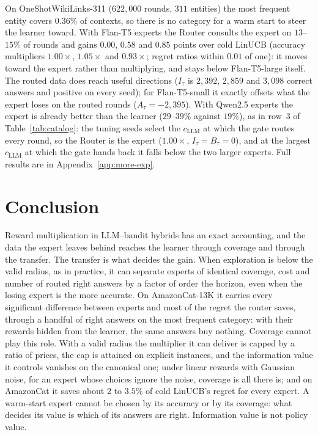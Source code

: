 \documentclass[anon]{alt2027} %
\begin{document}
On OneShotWikiLinks-311 ($622{,}000$ rounds, $311$ entities) the most
frequent entity covers $0.36\%$ of contexts, so there is no category for a
warm start to steer the learner toward. With Flan-T5 experts the Router
consults the expert on $13$--$15\%$ of rounds and gains $0.00$, $0.58$ and
$0.85$ points over cold LinUCB (accuracy multipliers $1.00\times$,
$1.05\times$ and $0.93\times$; regret ratios within $0.01$ of one): it moves
toward the expert rather than multiplying, and stays below Flan-T5-large
itself. The routed data does reach useful directions ($I_\tau$ is $2{,}392$,
$2{,}859$ and $3{,}098$ correct answers and positive on every seed); for
Flan-T5-small it exactly offsets what the expert loses on the routed rounds
($A_\tau=-2{,}395$). With Qwen2.5 experts the expert is already better than
the learner ($29$--$39\%$ against $19\%$), as in row~3 of
Table~\ref{tab:catalog}: the tuning seeds select the $c_{\mathrm{LLM}}$ at which the
gate routes every round, so the Router is the expert ($1.00\times$,
$I_\tau=B_\tau=0$), and at the largest $c_{\mathrm{LLM}}$ at which the gate hands
back it falls below the two larger experts. Full results are in
Appendix~\ref{app:more-exp}.

\section{Conclusion}
\label{sec:conclusion}

Reward multiplication in LLM--bandit hybrids has an exact accounting, and the
data the expert leaves behind reaches the learner through coverage and
through the transfer. The transfer is what decides the gain. When
exploration is below the valid radius, as in practice, it can separate
experts of identical coverage, cost and number of routed right answers by a
factor of order the horizon, even when the losing expert is the more
accurate. On AmazonCat-13K it carries every significant difference between
experts and most of the regret the router saves, through a handful of right
answers on the most frequent category: with their rewards hidden from the
learner, the same answers buy nothing. Coverage cannot play this role. With a
valid radius the multiplier it can deliver is capped by a ratio of prices,
the cap is attained on explicit instances, and the information value it
controls vanishes on the canonical one; under linear rewards with Gaussian
noise, for an expert whose choices ignore the noise, coverage is all there
is; and on AmazonCat it saves about $2$ to $3.5\%$ of cold LinUCB's regret
for every expert. A warm-start expert cannot be chosen by its accuracy or by
its coverage: what decides its value is which of its answers are right.
Information value is not policy value.
\end{document}
